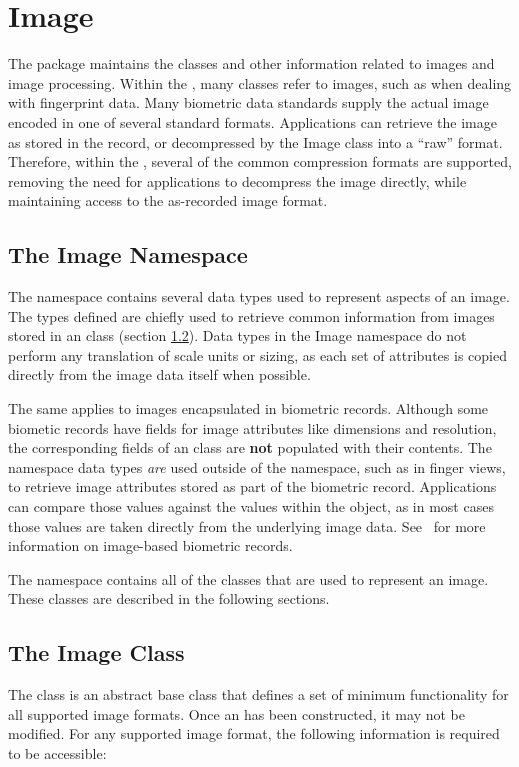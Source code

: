 %
%
\chapter{Image}
\label{chp-image}

The  package maintains the classes and other information related to images
and image processing. Within the \lname, many classes refer to images, such as
when dealing with fingerprint data. Many biometric data standards supply the
actual image encoded in one of several standard formats. Applications can
retrieve the image as stored in the record, or decompressed by the Image class
into a ``raw'' format. Therefore, within the \sname, several of the common
compression formats are supported, removing the need for applications to
decompress the image directly, while maintaining access to the as-recorded
image format.

\section{The Image Namespace}
\label{sec-imagenamespace}
The  namespace contains several data types used to represent
aspects of an image.  The types defined are chiefly used to retrieve common
information from images stored in an  class (section
\ref{sec-imageclass}).  Data types in the Image namespace do not perform
any translation of scale units or sizing, as each set of attributes is copied 
directly from the image data itself when possible.

The same applies to images encapsulated in biometric records.  Although some 
biometic records have fields for image attributes like dimensions and 
resolution, the corresponding fields of an  class are {\bf not} populated 
with their contents.  The  namespace data types {\em are} used outside of 
the  namespace, such as in finger views, to retrieve image attributes stored as 
part of the biometric record.  Applications can compare those values against 
the values within the  object, as in most cases those values are taken 
directly from the underlying image data.  See~ for more 
information on image-based biometric records.

The  namespace contains all of the  classes that are used to
represent an image. These classes are described in the following sections.

\section{The Image Class}
\label{sec-imageclass}
The  class is an abstract base class that defines a set of minimum 
functionality for all supported image formats.  Once an  has been 
constructed, it may not be modified.  For any supported image format, the 
following information is required to be accessible:

